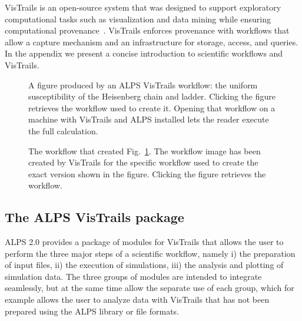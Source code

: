 \documentclass[12pt]{iopart}
\begin{document}
VisTrails is an open-source system that was designed to support
exploratory computational tasks such as visualization and data mining
while ensuring computational provenance~\cite{vistrails,Bavoil05}.
VisTrails enforces provenance with workflows that allow a capture
mechanism and an infrastructure for storage, access, and queries. In the appendix we present a concise introduction to scientific workflows and VisTrails.

\begin{figure}
\begin{center}

\caption{A figure produced by an ALPS VisTrails workflow: the uniform susceptibility of the Heisenberg chain and ladder. Clicking the figure retrieves the workflow used to 
create it. Opening that workflow on a machine with VisTrails and ALPS installed lets the reader execute the full calculation.}
\label{fig:figure}
\end{center}
\end{figure}


\begin{figure}
\begin{center}
\caption{The workflow that created Fig.~\ref{fig:figure}. The workflow image has been created by VisTrails for the specific workflow used to create the exact version shown in the figure. Clicking the figure retrieves the workflow.}
\label{fig:workflow}
\end{center}
\end{figure}



\subsection{The ALPS VisTrails package}

ALPS 2.0 provides a package of modules for VisTrails that allows the user to perform the three major steps of a scientific workflow, namely i) the preparation of input files, ii) the execution of simulations, iii) the analysis and plotting of simulation data. The three groups of modules are intended to integrate seamlessly, but at the same time allow the separate use of each group, which for example allows the user to analyze data with VisTrails that has not been prepared using the ALPS library or file formats.
\end{document}
